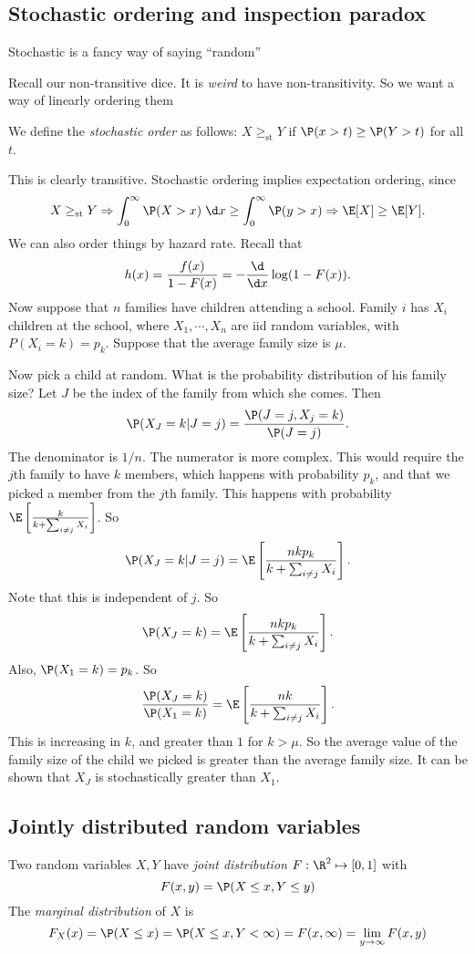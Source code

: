 \documentclass[a4paper]{article}
\begin{document}
\subsection{Stochastic ordering and inspection paradox}
\note Stochastic is a fancy way of saying ``random''

Recall our non-transitive dice. It is \emph{weird} to have non-transitivity. So we want a way of linearly ordering them

\begin{defi}
  We define the \emph{stochastic order} as follows: $X \geq_{\mathrm{st}} Y$ if $\P(x > t) \geq \P(Y > t)$ for all $t$.
\end{defi}
This is clearly transitive. Stochastic ordering implies expectation ordering, since
\[
  X \geq_{\mathrm{st}} Y \Rightarrow  \int_0^\infty \P(X > x)\;\d x \geq \int_0^\infty \P(y > x) \Rightarrow  \E[X] \geq \E[Y].
\]
\note We can also order things by hazard rate. Recall that
\[
  h(x) = \frac{f(x)}{1 - F(x)} = -\frac{\d }{\d x}\log(1 - F(x)).
\]
Now suppose that $n$ families have children attending a school. Family $i$ has $X_i$ children at the school, where $X_1, \cdots, X_n$ are iid random variables, with $P(X_i = k) = p_k$. Suppose that the average family size is $\mu$.

Now pick a child at random. What is the probability distribution of his family size? Let $J$ be the index of the family from which she comes. Then
\[
  \P(X_J = k| J = j) = \frac{\P(J = j, X_j = k)}{\P(J = j)}.
\]
The denominator is $1/n$. The numerator is more complex. This would require the $j$th family to have $k$ members, which happens with probability $p_k$, and that we picked a member from the $j$th family. This happens with probability $\E\left[\frac{k}{k + \sum_{i \not=j} X_i}\right]$. So 
\[
  \P(X_J = k | J = j) = \E\left[\frac{nkp_k}{k + \sum_{i \not=j} X_i}\right].
\]
Note that this is independent of $j$. So
\[
  \P(X_J = k) = \E\left[\frac{nkp_k}{k + \sum_{i \not=j} X_i}\right].
\]
Also, $\P(X_1 = k) = p_k$. So
\[
  \frac{\P(X_J = k)}{\P(X_1 = k)} = \E\left[\frac{nk}{k + \sum_{i \not= j}X_i}\right].
\]
This is increasing in $k$, and greater than $1$ for $k > \mu$. So the average value of the family size of the child we picked is greater than the average family size. It can be shown that $X_J$ is stochastically greater than $X_1$.

\subsection{Jointly distributed random variables}
\begin{defi}
  Two random variables $X, Y$ have \emph{joint distribution} $F: \R^2 \mapsto [0, 1]$ with 
  \[
    F(x, y) = \P(X \leq x, Y \leq y)
  \]
  The \emph{marginal distribution} of $X$ is
  \[
    F_X(x) = \P(X \leq x) = \P(X \leq x, Y < \infty) = F(x, \infty) = \lim_{y \to \infty}F(x, y)
  \]
\end{defi}
\end{document}
